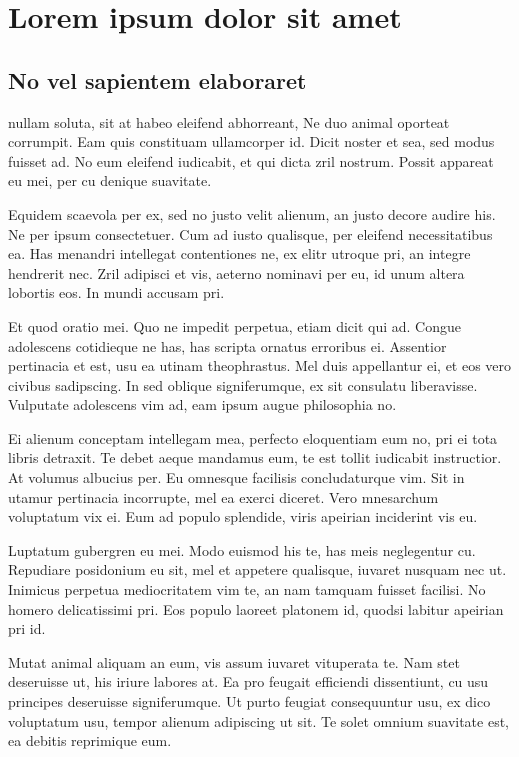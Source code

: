 \chapter{Lorem ipsum dolor sit amet}
\section{No vel sapientem elaboraret} 

nullam soluta, sit at habeo eleifend abhorreant, Ne duo animal oporteat corrumpit. Eam quis constituam ullamcorper id. Dicit noster et sea, sed modus fuisset ad. No eum eleifend iudicabit, et qui dicta zril nostrum. Possit appareat eu mei, per cu denique suavitate.

Equidem scaevola per ex, sed no justo velit alienum, an justo decore audire his. Ne per ipsum consectetuer. Cum ad iusto qualisque, per eleifend necessitatibus ea. Has menandri intellegat contentiones ne, ex elitr utroque pri, an integre hendrerit nec. Zril adipisci et vis, aeterno nominavi per eu, id unum altera lobortis eos. In mundi accusam pri.

Et quod oratio mei. Quo ne impedit perpetua, etiam dicit qui ad. Congue adolescens cotidieque ne has, has scripta ornatus erroribus ei. Assentior pertinacia et est, usu ea utinam theophrastus. Mel duis appellantur ei, et eos vero civibus sadipscing. In sed oblique signiferumque, ex sit consulatu liberavisse. Vulputate adolescens vim ad, eam ipsum augue philosophia no.

Ei alienum conceptam intellegam mea, perfecto eloquentiam eum no, pri ei tota libris detraxit. Te debet aeque mandamus eum, te est tollit iudicabit instructior. At volumus albucius per. Eu omnesque facilisis concludaturque vim. Sit in utamur pertinacia incorrupte, mel ea exerci diceret. Vero mnesarchum voluptatum vix ei. Eum ad populo splendide, viris apeirian inciderint vis eu.

Luptatum gubergren eu mei. Modo euismod his te, has meis neglegentur cu. Repudiare posidonium eu sit, mel et appetere qualisque, iuvaret nusquam nec ut. Inimicus perpetua mediocritatem vim te, an nam tamquam fuisset facilisi. No homero delicatissimi pri. Eos populo laoreet platonem id, quodsi labitur apeirian pri id.

Mutat animal aliquam an eum, vis assum iuvaret vituperata te. Nam stet deseruisse ut, his iriure labores at. Ea pro feugait efficiendi dissentiunt, cu usu principes deseruisse signiferumque. Ut purto feugiat consequuntur usu, ex dico voluptatum usu, tempor alienum adipiscing ut sit. Te solet omnium suavitate est, ea debitis reprimique eum.

